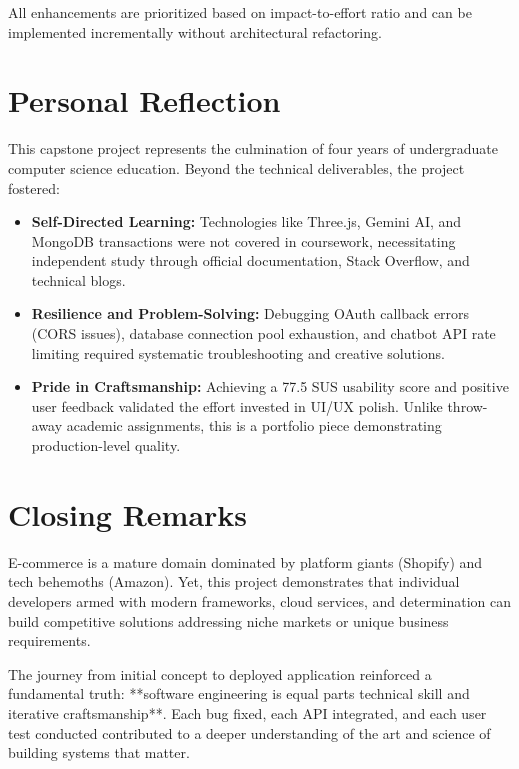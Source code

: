 \documentclass[12pt, a4paper]{report}
\begin{document}

All enhancements are prioritized based on impact-to-effort ratio and can be implemented incrementally without architectural refactoring.

\section{Personal Reflection}

This capstone project represents the culmination of four years of undergraduate computer science education. Beyond the technical deliverables, the project fostered:

\begin{itemize}
    \item \textbf{Self-Directed Learning:} Technologies like Three.js, Gemini AI, and MongoDB transactions were not covered in coursework, necessitating independent study through official documentation, Stack Overflow, and technical blogs.
    
    \item \textbf{Resilience and Problem-Solving:} Debugging OAuth callback errors (CORS issues), database connection pool exhaustion, and chatbot API rate limiting required systematic troubleshooting and creative solutions.
    
    \item \textbf{Pride in Craftsmanship:} Achieving a 77.5 SUS usability score and positive user feedback validated the effort invested in UI/UX polish. Unlike throw-away academic assignments, this is a portfolio piece demonstrating production-level quality.
\end{itemize}

\section{Closing Remarks}

E-commerce is a mature domain dominated by platform giants (Shopify) and tech behemoths (Amazon). Yet, this project demonstrates that individual developers armed with modern frameworks, cloud services, and determination can build competitive solutions addressing niche markets or unique business requirements.

The journey from initial concept to deployed application reinforced a fundamental truth: **software engineering is equal parts technical skill and iterative craftsmanship**. Each bug fixed, each API integrated, and each user test conducted contributed to a deeper understanding of the art and science of building systems that matter.
\end{document}
